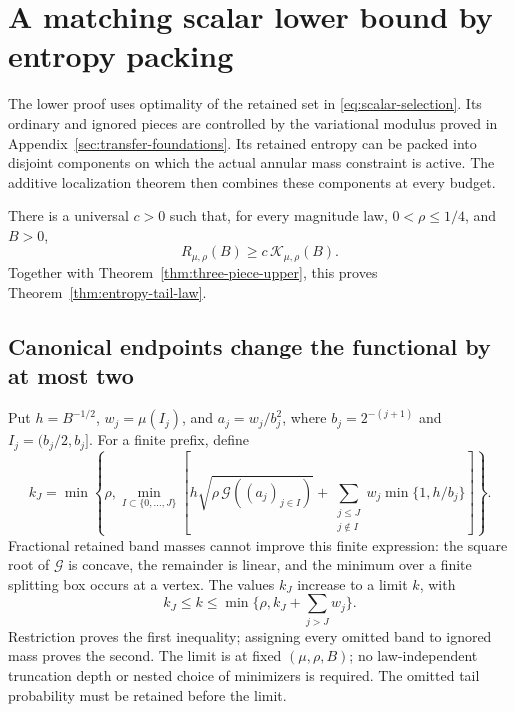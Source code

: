 \section{A matching scalar lower bound by entropy packing}
\label{sec:matching-lower}

The lower proof uses optimality of the retained set in
\eqref{eq:scalar-selection}. Its ordinary and ignored pieces are controlled
by the variational modulus proved in Appendix~\ref{sec:transfer-foundations}. Its retained entropy can be packed
into disjoint components on which the actual annular mass constraint is
active. The additive localization theorem then combines these components
at every budget.

\begin{theorem}
\label{thm:entropy-tail-lower}
There is a universal $c>0$ such that, for every magnitude law,
$0<\rho\le1/4$, and $B>0$,
\[
 R_{\mu,\rho}(B)\ge c\,\mathcal K_{\mu,\rho}(B).
\]
Together with Theorem~\ref{thm:three-piece-upper}, this proves
Theorem~\ref{thm:entropy-tail-law}.
\end{theorem}

\subsection{Canonical endpoints change the functional by at most two}

Put $h=B^{-1/2}$, $w_j=\mu(I_j)$, and $a_j=w_j/b_j^2$, where
$b_j=2^{-(j+1)}$ and $I_j=(b_j/2,b_j]$.
For a finite prefix, define
\begin{equation}\label{eq:canonical-selection-prefix}
 k_J=\min\left\{\rho,\min_{I\subset\{0,\ldots,J\}}
 \left[h\sqrt{\rho\,\mathcal G((a_j)_{j\in I})}
       +\sum_{\substack{j\le J\\j\notin I}}
                    w_j\min\{1,h/b_j\}\right]\right\}.
\end{equation}
Fractional retained band masses cannot improve this finite expression:
the square root of $\mathcal G$ is concave, the remainder is linear,
and the minimum over a finite splitting box occurs at a vertex.
The values $k_J$ increase to a limit $k$, with
\begin{equation}\label{eq:canonical-prefix-limit}
 k_J\le k\le\min\{\rho,k_J+\sum_{j>J}w_j\}.
\end{equation}
Restriction proves the first inequality; assigning every omitted band to
ignored mass proves the second. The limit is at fixed $(\mu,\rho,B)$;
no law-independent truncation depth or nested choice of minimizers is
required. The omitted tail probability must be retained before the limit.

